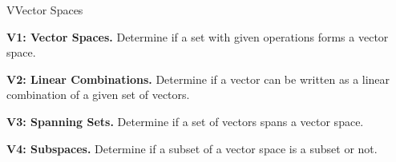 
\begin{module}{V}{Vector Spaces}

\begin{moduleStandards}
  \item \textbf{V1: Vector Spaces.}
        Determine if a set with given operations forms a vector space.
  \item \textbf{V2: Linear Combinations.}
        Determine if a vector can be written as a linear combination of
        a given set of vectors.
  \item \textbf{V3: Spanning Sets.}
        Determine if a set of vectors spans a vector space.
  \item \textbf{V4: Subspaces.}
        Determine if a subset of a vector space is a subset or not.
\end{moduleStandards}







\end{module}
